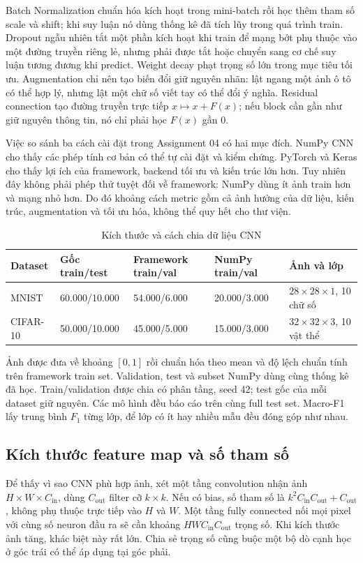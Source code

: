 \documentclass[12pt,a4paper]{report}
\begin{document}
Batch Normalization chuẩn hóa kích hoạt trong mini-batch rồi học thêm tham số scale và shift; khi suy luận nó dùng thống kê đã tích lũy trong quá trình train. Dropout ngẫu nhiên tắt một phần kích hoạt khi train để mạng bớt phụ thuộc vào một đường truyền riêng lẻ, nhưng phải được tắt hoặc chuyển sang cơ chế suy luận tương đương khi predict. Weight decay phạt trọng số lớn trong mục tiêu tối ưu. Augmentation chỉ nên tạo biến đổi giữ nguyên nhãn: lật ngang một ảnh ô tô có thể hợp lý, nhưng lật một chữ số viết tay có thể đổi ý nghĩa. Residual connection tạo đường truyền trực tiếp $x\mapsto x+F(x)$; nếu block cần gần như giữ nguyên thông tin, nó chỉ phải học $F(x)$ gần 0.

Việc so sánh ba cách cài đặt trong Assignment 04 có hai mục đích. NumPy CNN cho thấy các phép tính cơ bản có thể tự cài đặt và kiểm chứng. PyTorch và Keras cho thấy lợi ích của framework, backend tối ưu và kiến trúc lớn hơn. Tuy nhiên đây không phải phép thử tuyệt đối về framework: NumPy dùng ít ảnh train hơn và mạng nhỏ hơn. Do đó khoảng cách metric gồm cả ảnh hưởng của dữ liệu, kiến trúc, augmentation và tối ưu hóa, không thể quy hết cho thư viện.

\begin{table}[htbp]\centering\caption{Kích thước và cách chia dữ liệu CNN}\label{tab:cnn-splits}
\footnotesize\begin{tabularx}{\textwidth}{p{1.7cm}p{2.2cm}p{2.3cm}p{2.3cm}X}
\toprule\textbf{Dataset} & \textbf{Gốc train/test} & \textbf{Framework train/val} & \textbf{NumPy train/val} & \textbf{Ảnh và lớp}\\\midrule
MNIST & 60.000/10.000 & 54.000/6.000 & 20.000/3.000 & $28\times28\times1$, 10 chữ số\\
CIFAR-10 & 50.000/10.000 & 45.000/5.000 & 15.000/3.000 & $32\times32\times3$, 10 vật thể\\
\bottomrule\end{tabularx}\end{table}

Ảnh được đưa về khoảng $[0,1]$ rồi chuẩn hóa theo mean và độ lệch chuẩn tính trên framework train set. Validation, test và subset NumPy dùng cùng thống kê đã học. Train/validation được chia có phân tầng, seed 42; test gốc của mỗi dataset giữ nguyên. Các mô hình đều báo cáo trên cùng full test set. Macro-F1 lấy trung bình $F_1$ từng lớp, để lớp có ít hay nhiều mẫu đều đóng góp như nhau.

\subsection{Kích thước feature map và số tham số}
Để thấy vì sao CNN phù hợp ảnh, xét một tầng convolution nhận ảnh $H\times W\times C_{\mathrm{in}}$, dùng $C_{\mathrm{out}}$ filter cỡ $k\times k$. Nếu có bias, số tham số là $k^2C_{\mathrm{in}}C_{\mathrm{out}}+C_{\mathrm{out}}$, không phụ thuộc trực tiếp vào $H$ và $W$. Một tầng fully connected nối mọi pixel với cùng số neuron đầu ra sẽ cần khoảng $HWC_{\mathrm{in}}C_{\mathrm{out}}$ trọng số. Khi kích thước ảnh tăng, khác biệt này rất lớn. Chia sẻ trọng số cũng buộc một bộ dò cạnh học ở góc trái có thể áp dụng tại góc phải.
\end{document}
